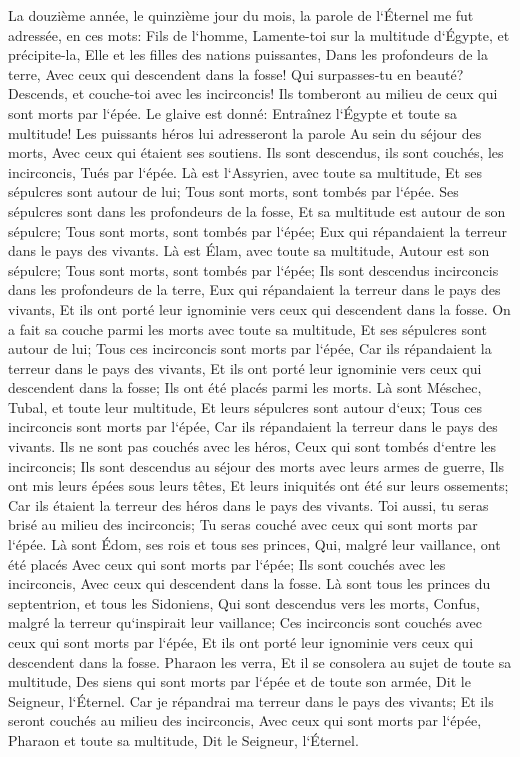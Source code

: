 \verse La douzième année, le quinzième jour du mois, la parole de l`Éternel me fut adressée, en ces mots: 
\verse Fils de l`homme, Lamente-toi sur la multitude d`Égypte, et précipite-la, Elle et les filles des nations puissantes, Dans les profondeurs de la terre, Avec ceux qui descendent dans la fosse! 
\verse Qui surpasses-tu en beauté? Descends, et couche-toi avec les incirconcis! 
\verse Ils tomberont au milieu de ceux qui sont morts par l`épée. Le glaive est donné: Entraînez l`Égypte et toute sa multitude! 
\verse Les puissants héros lui adresseront la parole Au sein du séjour des morts, Avec ceux qui étaient ses soutiens. Ils sont descendus, ils sont couchés, les incirconcis, Tués par l`épée. 
\verse Là est l`Assyrien, avec toute sa multitude, Et ses sépulcres sont autour de lui; Tous sont morts, sont tombés par l`épée. 
\verse Ses sépulcres sont dans les profondeurs de la fosse, Et sa multitude est autour de son sépulcre; Tous sont morts, sont tombés par l`épée; Eux qui répandaient la terreur dans le pays des vivants. 
\verse Là est Élam, avec toute sa multitude, Autour est son sépulcre; Tous sont morts, sont tombés par l`épée; Ils sont descendus incirconcis dans les profondeurs de la terre, Eux qui répandaient la terreur dans le pays des vivants, Et ils ont porté leur ignominie vers ceux qui descendent dans la fosse. 
\verse On a fait sa couche parmi les morts avec toute sa multitude, Et ses sépulcres sont autour de lui; Tous ces incirconcis sont morts par l`épée, Car ils répandaient la terreur dans le pays des vivants, Et ils ont porté leur ignominie vers ceux qui descendent dans la fosse; Ils ont été placés parmi les morts. 
\verse Là sont Méschec, Tubal, et toute leur multitude, Et leurs sépulcres sont autour d`eux; Tous ces incirconcis sont morts par l`épée, Car ils répandaient la terreur dans le pays des vivants. 
\verse Ils ne sont pas couchés avec les héros, Ceux qui sont tombés d`entre les incirconcis; Ils sont descendus au séjour des morts avec leurs armes de guerre, Ils ont mis leurs épées sous leurs têtes, Et leurs iniquités ont été sur leurs ossements; Car ils étaient la terreur des héros dans le pays des vivants. 
\verse Toi aussi, tu seras brisé au milieu des incirconcis; Tu seras couché avec ceux qui sont morts par l`épée. 
\verse Là sont Édom, ses rois et tous ses princes, Qui, malgré leur vaillance, ont été placés Avec ceux qui sont morts par l`épée; Ils sont couchés avec les incirconcis, Avec ceux qui descendent dans la fosse. 
\verse Là sont tous les princes du septentrion, et tous les Sidoniens, Qui sont descendus vers les morts, Confus, malgré la terreur qu`inspirait leur vaillance; Ces incirconcis sont couchés avec ceux qui sont morts par l`épée, Et ils ont porté leur ignominie vers ceux qui descendent dans la fosse. 
\verse Pharaon les verra, Et il se consolera au sujet de toute sa multitude, Des siens qui sont morts par l`épée et de toute son armée, Dit le Seigneur, l`Éternel. 
\verse Car je répandrai ma terreur dans le pays des vivants; Et ils seront couchés au milieu des incirconcis, Avec ceux qui sont morts par l`épée, Pharaon et toute sa multitude, Dit le Seigneur, l`Éternel. 


